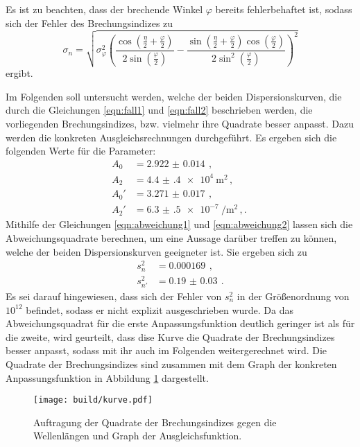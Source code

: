 Es ist zu beachten, dass
der brechende Winkel $\varphi$ bereits fehlerbehaftet ist, sodass sich der Fehler
des Brechungsindizes zu
\begin{equation*}
  \sigma_n = \sqrt{
   \sigma_{\varphi}^{2} \left(\frac{\cos{\left (\frac{\eta}{2} + \frac{\varphi}{2} \right )}}{2 \sin{\left (\frac{\varphi}{2} \right )}} - \frac{\sin{\left (\frac{\eta}{2}
  + \frac{\varphi}{2} \right )} \cos{\left (\frac{\varphi}{2} \right )}}{2 \sin^{2}{\left (\frac{\varphi}{2} \right )}}\right)^{2}}
\end{equation*}
ergibt.

Im Folgenden soll untersucht werden, welche der beiden Dispersionskurven, die durch die
Gleichungen \eqref{eqn:fall1} und \eqref{eqn:fall2} beschrieben werden, die vorliegenden
Brechungsindizes, bzw. vielmehr ihre Quadrate besser anpasst. Dazu werden die konkreten
Ausgleichsrechnungen durchgeführt. Es ergeben sich die folgenden Werte für die Parameter:
\begin{align*}
  A_0 &= \SI{2.922(14)}{}\,,\\
  A_2 &= \SI{4.4(4)e4}{\meter\squared}\,,\\
  A_0' &= \SI{3.271(17)}{}\,,\\
  A_2' &= \SI{6.3(5)e-7}{\per\meter\squared}\,,.\
\end{align*}
Mithilfe der Gleichungen \eqref{eqn:abweichung1} und \eqref{eqn:abweichung2} lassen sich die Abweichungsquadrate
berechnen, um eine Aussage darüber treffen zu können, welche der beiden Dispersionskurven
geeigneter ist. Sie ergeben sich zu
\begin{align*}
  s_n^2 &= \SI{0.000169}{}\,,\\
  s_{n'}^2 &= \SI{0.19(3)}{}\,.
\end{align*}
Es sei darauf hingewiesen, dass sich der Fehler von $s_n^2$ in der Größenordnung
von $10^{12}$ befindet, sodass er nicht explizit ausgeschrieben wurde.
Da das Abweichungsquadrat für die erste Anpassungsfunktion deutlich geringer ist als für
die zweite, wird geurteilt, dass dise Kurve die Quadrate der Brechungsindizes besser anpasst,
sodass mit ihr auch im Folgenden weitergerechnet wird.
Die Quadrate der Brechungsindizes sind zusammen mit dem Graph der konkreten Anpassungsfunktion
in Abbildung \ref{fig:kurve} dargestellt.

\begin{figure}[htp]
  \centering
  \texttt{[image: build/kurve.pdf]}
  \caption{Auftragung der Quadrate der Brechungsindizes gegen die Wellenlängen und Graph der Ausgleichsfunktion.}
  \label{fig:kurve}
\end{figure}

